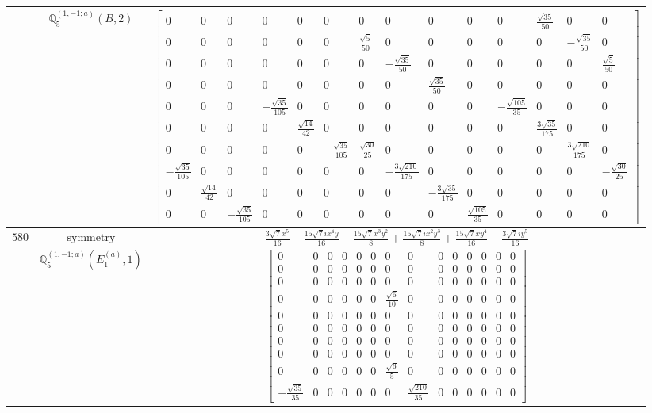 \documentclass[fleqn,8pt,landscape]{jsarticle}
\begin{document}
\begin{longtable}{ccc}
$  $ & $ \mathbb{Q}_{5}^{(1,-1;a)}(B,2) $ & $ \begin{bmatrix} 0 & 0 & 0 & 0 & 0 & 0 & 0 & 0 & 0 & 0 & 0 & \frac{\sqrt{35}}{50} & 0 & 0 \\ 0 & 0 & 0 & 0 & 0 & 0 & \frac{\sqrt{5}}{50} & 0 & 0 & 0 & 0 & 0 & - \frac{\sqrt{35}}{50} & 0 \\ 0 & 0 & 0 & 0 & 0 & 0 & 0 & - \frac{\sqrt{35}}{50} & 0 & 0 & 0 & 0 & 0 & \frac{\sqrt{5}}{50} \\ 0 & 0 & 0 & 0 & 0 & 0 & 0 & 0 & \frac{\sqrt{35}}{50} & 0 & 0 & 0 & 0 & 0 \\ 0 & 0 & 0 & - \frac{\sqrt{35}}{105} & 0 & 0 & 0 & 0 & 0 & 0 & - \frac{\sqrt{105}}{35} & 0 & 0 & 0 \\ 0 & 0 & 0 & 0 & \frac{\sqrt{14}}{42} & 0 & 0 & 0 & 0 & 0 & 0 & \frac{3 \sqrt{35}}{175} & 0 & 0 \\ 0 & 0 & 0 & 0 & 0 & - \frac{\sqrt{35}}{105} & \frac{\sqrt{30}}{25} & 0 & 0 & 0 & 0 & 0 & \frac{3 \sqrt{210}}{175} & 0 \\ - \frac{\sqrt{35}}{105} & 0 & 0 & 0 & 0 & 0 & 0 & - \frac{3 \sqrt{210}}{175} & 0 & 0 & 0 & 0 & 0 & - \frac{\sqrt{30}}{25} \\ 0 & \frac{\sqrt{14}}{42} & 0 & 0 & 0 & 0 & 0 & 0 & - \frac{3 \sqrt{35}}{175} & 0 & 0 & 0 & 0 & 0 \\ 0 & 0 & - \frac{\sqrt{35}}{105} & 0 & 0 & 0 & 0 & 0 & 0 & \frac{\sqrt{105}}{35} & 0 & 0 & 0 & 0 \end{bmatrix} $ \\ \hline
$ 580 $ & $ \text{symmetry} $ & $ \frac{3 \sqrt{7} x^{5}}{16} - \frac{15 \sqrt{7} i x^{4} y}{16} - \frac{15 \sqrt{7} x^{3} y^{2}}{8} + \frac{15 \sqrt{7} i x^{2} y^{3}}{8} + \frac{15 \sqrt{7} x y^{4}}{16} - \frac{3 \sqrt{7} i y^{5}}{16} $ \\
$  $ & $ \mathbb{Q}_{5}^{(1,-1;a)}(E_{1}^{(a)},1) $ & $ \begin{bmatrix} 0 & 0 & 0 & 0 & 0 & 0 & 0 & 0 & 0 & 0 & 0 & 0 & 0 & 0 \\ 0 & 0 & 0 & 0 & 0 & 0 & 0 & 0 & 0 & 0 & 0 & 0 & 0 & 0 \\ 0 & 0 & 0 & 0 & 0 & 0 & 0 & 0 & 0 & 0 & 0 & 0 & 0 & 0 \\ 0 & 0 & 0 & 0 & 0 & 0 & \frac{\sqrt{6}}{10} & 0 & 0 & 0 & 0 & 0 & 0 & 0 \\ 0 & 0 & 0 & 0 & 0 & 0 & 0 & 0 & 0 & 0 & 0 & 0 & 0 & 0 \\ 0 & 0 & 0 & 0 & 0 & 0 & 0 & 0 & 0 & 0 & 0 & 0 & 0 & 0 \\ 0 & 0 & 0 & 0 & 0 & 0 & 0 & 0 & 0 & 0 & 0 & 0 & 0 & 0 \\ 0 & 0 & 0 & 0 & 0 & 0 & 0 & 0 & 0 & 0 & 0 & 0 & 0 & 0 \\ 0 & 0 & 0 & 0 & 0 & 0 & \frac{\sqrt{6}}{5} & 0 & 0 & 0 & 0 & 0 & 0 & 0 \\ - \frac{\sqrt{35}}{35} & 0 & 0 & 0 & 0 & 0 & 0 & \frac{\sqrt{210}}{35} & 0 & 0 & 0 & 0 & 0 & 0 \end{bmatrix} $ \\ \hline

\end{longtable}
\end{document}
